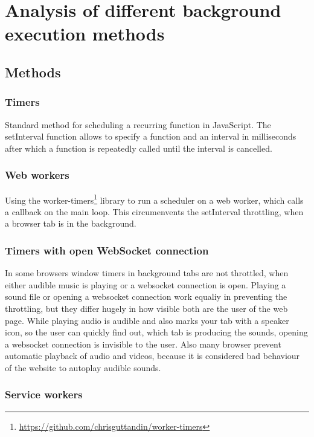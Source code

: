 \documentclass[article,type=bsc,colorback,accentcolor=tud9c]{tudthesis}
\begin{document}
  

  \newpage
  \section{Analysis of different background execution methods}

  \subsection{Methods}

  
  \subsubsection{Timers}

  Standard method for scheduling a recurring function in JavaScript. The setInterval function allows to specify a function and an interval in milliseconds after which a function is repeatedly called until the interval is cancelled.
  
  \subsubsection{Web workers}
  
  Using the worker-timers\footnote{\url{https://github.com/chrisguttandin/worker-timers}} library to run a scheduler on a web worker, which calls a callback on the main loop. This circumenvents the setInterval throttling, when a browser tab is in the background.

  \subsubsection{Timers with open WebSocket connection}

  In some browsers window timers in background tabs are not throttled, when either audible music is playing or a websocket connection is open. Playing a sound file or opening a websocket connection work equaliy in preventing the throttling, but they differ hugely in how visible both are the user of the web page. While playing audio is audible and also marks your tab with a speaker icon, so the user can quickly find out, which tab is producing the sounds, opening a websocket connection is invisible to the user. Also many browser prevent automatic playback of audio and videos, because it is considered bad behaviour of the website to autoplay audible sounds.

  
  
  \subsubsection{Service workers}
\end{document}
